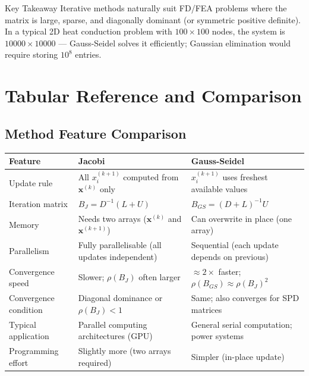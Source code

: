 \documentclass[12pt,a4paper]{article}
\begin{document}
\begin{learnbox}{Key Takeaway}
Iterative methods naturally suit FD/FEA problems where the matrix is large, sparse, and
diagonally dominant (or symmetric positive definite). In a typical 2D heat conduction
problem with \(100 \times 100\) nodes, the system is \(10000 \times 10000\) --- Gauss-Seidel
solves it efficiently; Gaussian elimination would require storing \(10^8\) entries.
\end{learnbox}

\section{Tabular Reference and Comparison}

\subsection*{Method Feature Comparison}

\begin{center}
\begin{tabular}{@{}p{3.5cm}p{4.5cm}p{4.5cm}@{}}
\toprule
\textbf{Feature} & \textbf{Jacobi} & \textbf{Gauss-Seidel} \\
\midrule
Update rule &
  All \(x_i^{(k+1)}\) computed from \(\mathbf{x}^{(k)}\) only &
  \(x_i^{(k+1)}\) uses freshest available values \\
\addlinespace
Iteration matrix &
  \(B_J = D^{-1}(L+U)\) &
  \(B_{GS} = (D+L)^{-1}U\) \\
\addlinespace
Memory &
  Needs two arrays (\(\mathbf{x}^{(k)}\) and \(\mathbf{x}^{(k+1)}\)) &
  Can overwrite in place (one array) \\
\addlinespace
Parallelism &
  Fully parallelisable (all updates independent) &
  Sequential (each update depends on previous) \\
\addlinespace
Convergence speed &
  Slower; \(\rho(B_J)\) often larger &
  \(\approx 2\times\) faster; \(\rho(B_{GS})\approx\rho(B_J)^2\) \\
\addlinespace
Convergence condition &
  Diagonal dominance or \(\rho(B_J)<1\) &
  Same; also converges for SPD matrices \\
\addlinespace
Typical application &
  Parallel computing architectures (GPU) &
  General serial computation; power systems \\
\addlinespace
Programming effort &
  Slightly more (two arrays required) &
  Simpler (in-place update) \\
\bottomrule
\end{tabular}
\end{center}
\end{document}
